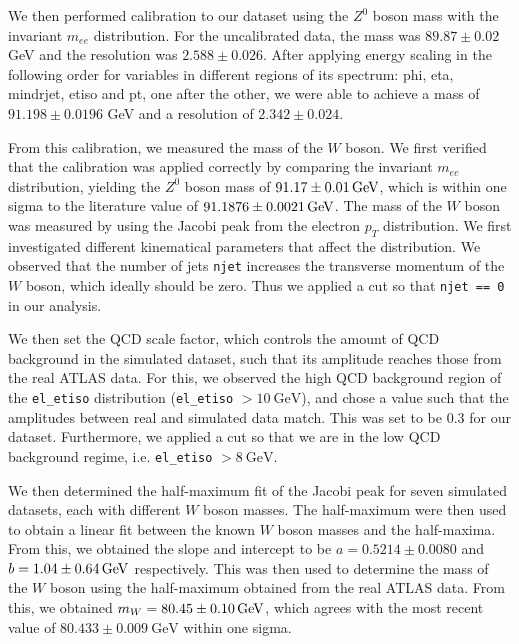 \documentclass[a4paper]{report}
\numberwithin{equation}{section}
\begin{document}
We then performed calibration to our dataset using the $Z^0$ boson mass with the invariant $m_{ee}$ distribution. For the uncalibrated data, the mass was $89.87 \pm 0.02$ GeV and the resolution was $2.588 \pm 0.026$. After applying energy scaling in the following order for variables in different regions of its spectrum: phi, eta, mindrjet, etiso and pt, one after the other, we were able to achieve a mass of $91.198 \pm 0.0196$ GeV and a resolution of $2.342 \pm 0.024$. \par 

From this calibration, we measured the mass of the $W$ boson. We first verified that the calibration was applied correctly by 
comparing the invariant $m_{ee}$ distribution, yielding the $Z^0$ boson mass of $\SI{91.17 \pm 0.01}{\giga\electronvolt}$, which 
is within one sigma to the literature value of $\SI{91.1876 \pm 0.0021}{\giga\electronvolt}$. The mass of the $W$ boson was measured by using the Jacobi peak from the 
electron $p_T$ distribution. We first investigated different kinematical parameters that affect the distribution. We observed 
that the number of jets \texttt{njet} increases the transverse momentum of the $W$ boson, which ideally should be zero. Thus we 
applied a cut so that \texttt{njet == 0} in our analysis.

We then set the QCD scale factor, which controls the amount of QCD background in the simulated 
dataset, such that its amplitude reaches those from the real ATLAS data. For this, we observed the high QCD background 
region of the \texttt{el\_etiso} distribution (\texttt{el\_etiso} $> \SI{10}{\giga\electronvolt}$), and chose a value such that 
the amplitudes between real and simulated data match. This was set to be 0.3 for our dataset. Furthermore, we applied a cut 
so that we are in the low QCD background regime, i.e. \texttt{el\_etiso} $> \SI{8}{\giga\electronvolt}$. \par 

We then determined the half-maximum fit of the Jacobi peak for seven simulated datasets, each with different $W$ boson masses. 
The half-maximum were then used to obtain a linear fit between the known $W$ boson masses and the half-maxima. From this, we obtained 
the slope and intercept to be $a = 0.5214 \pm 0.0080$ and $b = \SI{1.04 \pm 0.64}{\giga\electronvolt}$ respectively. This was then 
used to determine the mass of the $W$ boson using the half-maximum obtained from the real ATLAS data. From this, we obtained 
$m_W = \SI{80.45 \pm 0.10}{\giga\electronvolt}$, which agrees with the most recent value of $80.433 \pm 0.009 \ \text{GeV}$ 
within one sigma. \par 
\end{document}
